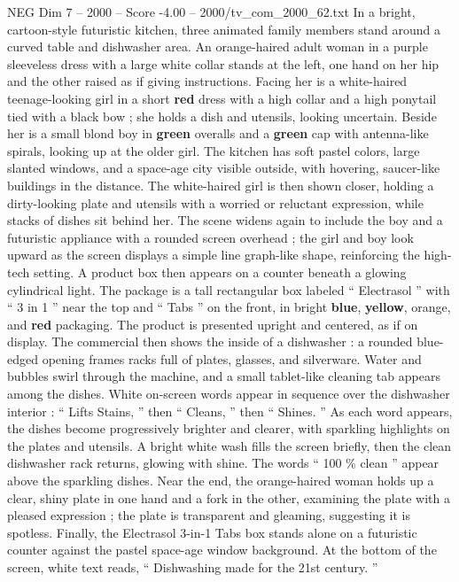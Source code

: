 \begin{textsample}{NEG Dim 7 – 2000 – Score -4.00 – 2000/tv\_com\_2000\_62.txt}  \label{ex:f7_neg_025}
In a bright, cartoon-style futuristic kitchen, three animated family members stand around a curved table and dishwasher area.
An orange-haired adult woman in a purple sleeveless dress with a large white collar stands at the left, one hand on her hip and the other raised as if giving instructions.
Facing her is a white-haired teenage-looking girl in a short \textbf{red} dress with a high collar and a high ponytail tied with a black bow ; she holds a dish and utensils, looking uncertain.
Beside her is a small blond boy in \textbf{green} overalls and a \textbf{green} cap with antenna-like spirals, looking up at the older girl.
The kitchen has soft pastel colors, large slanted windows, and a space-age city visible outside, with hovering, saucer-like buildings in the distance.
The white-haired girl is then shown closer, holding a dirty-looking plate and utensils with a worried or reluctant expression, while stacks of dishes sit behind her.
The scene widens again to include the boy and a futuristic appliance with a rounded screen overhead ; the girl and boy look upward as the screen displays a simple line graph-like shape, reinforcing the high-tech setting.
A product box then appears on a counter beneath a glowing cylindrical light.
The package is a tall rectangular box labeled “ Electrasol ” with “ 3 in 1 ” near the top and “ Tabs ” on the front, in bright \textbf{blue}, \textbf{yellow}, orange, and \textbf{red} packaging.
The product is presented upright and centered, as if on display.
The commercial then shows the inside of a dishwasher : a rounded blue-edged opening frames racks full of plates, glasses, and silverware.
Water and bubbles swirl through the machine, and a small tablet-like cleaning tab appears among the dishes.
White on-screen words appear in sequence over the dishwasher interior : “ Lifts Stains, ” then “ Cleans, ” then “ Shines. ” As each word appears, the dishes become progressively brighter and clearer, with sparkling highlights on the plates and utensils.
A bright white wash fills the screen briefly, then the clean dishwasher rack returns, glowing with shine.
The words “ 100 \% clean ” appear above the sparkling dishes.
Near the end, the orange-haired woman holds up a clear, shiny plate in one hand and a fork in the other, examining the plate with a pleased expression ; the plate is transparent and gleaming, suggesting it is spotless.
Finally, the Electrasol 3-in-1 Tabs box stands alone on a futuristic counter against the pastel space-age window background.
At the bottom of the screen, white text reads, “ Dishwashing made for the 21st century. ”

\end{textsample}

